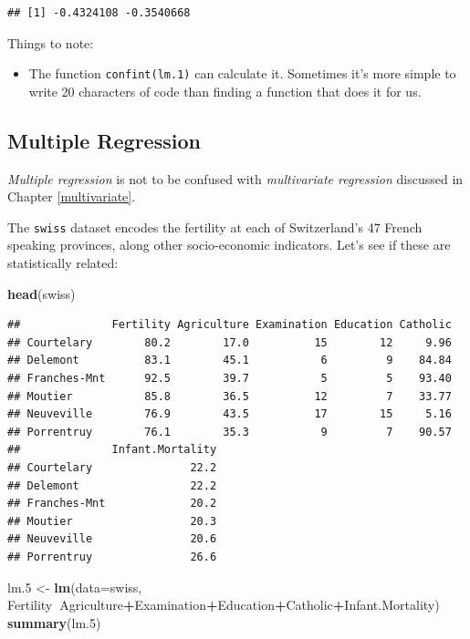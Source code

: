 \documentclass[]{book}
\newenvironment{Shaded}{\begin{snugshade}}{\end{snugshade}}
\newcommand{\KeywordTok}[1]{\textcolor[rgb]{0.13,0.29,0.53}{\textbf{#1}}}
\newcommand{\DataTypeTok}[1]{\textcolor[rgb]{0.13,0.29,0.53}{#1}}
\newcommand{\DecValTok}[1]{\textcolor[rgb]{0.00,0.00,0.81}{#1}}
\newcommand{\StringTok}[1]{\textcolor[rgb]{0.31,0.60,0.02}{#1}}
\newcommand{\OperatorTok}[1]{\textcolor[rgb]{0.81,0.36,0.00}{\textbf{#1}}}
\newcommand{\NormalTok}[1]{#1}
\providecommand{\tightlist}{%
  \setlength{\itemsep}{0pt}\setlength{\parskip}{0pt}}
\theoremstyle{definition}
\theoremstyle{definition}
\theoremstyle{definition}
\theoremstyle{remark}
\let\BeginKnitrBlock\begin \let\EndKnitrBlock\end
\begin{document}
\begin{verbatim}
## [1] -0.4324108 -0.3540668
\end{verbatim}

Things to note:

\begin{itemize}
\tightlist
\item
  The function \texttt{confint(lm.1)} can calculate it. Sometimes it's
  more simple to write 20 characters of code than finding a function
  that does it for us.
\end{itemize}

\subsection{Multiple Regression}\label{multiple-regression}

\BeginKnitrBlock{remark}
{}\emph{Multiple regression} is not to be
confused with \emph{multivariate regression} discussed in Chapter
\ref{multivariate}.
\EndKnitrBlock{remark}

The \texttt{swiss} dataset encodes the fertility at each of
Switzerland's 47 French speaking provinces, along other socio-economic
indicators. Let's see if these are statistically related:

\begin{Shaded}
\begin{Highlighting}[]
\KeywordTok{head}\NormalTok{(swiss)}
\end{Highlighting}
\end{Shaded}

\begin{verbatim}
##              Fertility Agriculture Examination Education Catholic
## Courtelary        80.2        17.0          15        12     9.96
## Delemont          83.1        45.1           6         9    84.84
## Franches-Mnt      92.5        39.7           5         5    93.40
## Moutier           85.8        36.5          12         7    33.77
## Neuveville        76.9        43.5          17        15     5.16
## Porrentruy        76.1        35.3           9         7    90.57
##              Infant.Mortality
## Courtelary               22.2
## Delemont                 22.2
## Franches-Mnt             20.2
## Moutier                  20.3
## Neuveville               20.6
## Porrentruy               26.6
\end{verbatim}

\begin{Shaded}
\begin{Highlighting}[]
\NormalTok{lm.}\DecValTok{5}\NormalTok{ <-}\StringTok{ }\KeywordTok{lm}\NormalTok{(}\DataTypeTok{data=}\NormalTok{swiss, Fertility}\OperatorTok{~}\NormalTok{Agriculture}\OperatorTok{+}\NormalTok{Examination}\OperatorTok{+}\NormalTok{Education}\OperatorTok{+}\NormalTok{Catholic}\OperatorTok{+}\NormalTok{Infant.Mortality)}
\KeywordTok{summary}\NormalTok{(lm.}\DecValTok{5}\NormalTok{)}
\end{Highlighting}
\end{Shaded}
\end{document}
